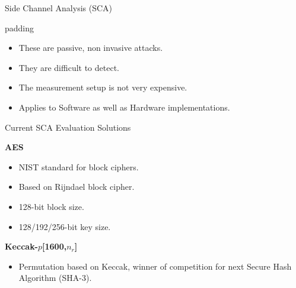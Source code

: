 \documentclass[final]{beamer}
\begin{document}
\begin{frame}[fragile]{}
\begin{columns}[t]
\begin{column}{.31\linewidth}
\begin{block}{Side Channel Analysis (SCA)}
        \begin{center}
        \begin{minipage}[t]{0.9\linewidth}  
        \begin{beamercolorbox}[rounded=true]{padding}
          \begin{itemize}
            \item These are passive, non invasive attacks.
            \item They are difficult to detect.
            \item The measurement setup is not very expensive.
            \item Applies to Software as well as Hardware implementations.
          \end{itemize}
        \end{beamercolorbox}
        \end{minipage}
        \end{center}
      \end{block}
      \begin{block}{Current SCA Evaluation Solutions}
        \begin{minipage}[t]{0.49\linewidth}
          {\large\textbf{AES}}%
          \begin{itemize}
            \item NIST standard for block ciphers.
             \item Based on Rijndael block cipher.
            \item 128-bit block size.
            \item 128/192/256-bit key size.
          \end{itemize}
        \end{minipage}%
        \begin{minipage}[t]{0.49\linewidth}  
          {\large\textbf{Keccak-$p$[1600,$n_r$]}}%
          \begin{itemize}
            \item Permutation based on Keccak, winner of competition for next Secure Hash Algorithm (SHA-3).

\end{itemize}
\end{minipage}
\end{block}
\end{column}
\end{columns}
\end{frame}
\end{document}
